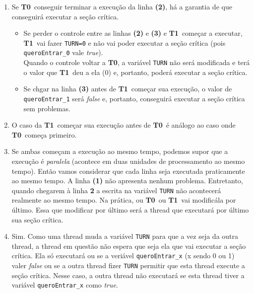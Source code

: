 \documentclass{article}
\newcommand{\Tz}{\textbf{T0}}
\newcommand{\Tu}{\textbf{T1}}
\begin{document}
\begin{enumerate}[label=\textbf{\alph*)}]
	\item Se \Tz\ conseguir terminar a execução da linha \textbf{(2)}, há a garantia de que conseguirá
		executar a seção crítica.
		\begin{itemize}
			\item Se perder o controle entre as linhas \textbf{(2)} e \textbf{(3)} e \Tu\ começar a
				executar, \Tu\ vai fazer \texttt{TURN=0} e não vai poder executar a seção crítica (pois
				\texttt{queroEntrar\_0} vale \emph{true}).\\
				Quando o controle voltar a \Tz, a variável \texttt{TURN} não será modificada e terá o valor
				que \Tu\ deu a ela (0) e, portanto, poderá executar a seção crítica.
			\item Se chgar na linha \textbf{(3)} antes de \Tu\ começar sua execução, o valor de
				\texttt{queroEntrar\_1} será \emph{false} e, portanto, conseguirá executar a seção crítica
				sem problemas.
		\end{itemize}
	\item
		O caso da \Tu\ começar sua execução antes de \Tz\ é análogo ao caso onde \Tz\ começa primeiro.
	\item
		Se ambas começam a execução ao mesmo tempo, podemos supor que a execução é \emph{paralela} (acontece
		em duas unidades de processamento ao mesmo tempo). Então vamos considerar que cada linha seja executada
		praticamente ao mesmo tempo. A linha \textbf{(1)} não apresenta nenhum problema. Entretanto, quando
		chegarem à linha \textbf{2} a escrita na variável \texttt{TURN} não acontecerá realmente ao mesmo tempo.
		Na prática, ou \Tz\ ou \Tu\ vai modificála por último. Essa que modificar por último será a thread que
		executará por último sua seção crítica.
	\item
		Sim. Como uma thread muda a variável \texttt{TURN} para que a vez seja da outra thread, a thread em
		questão não espera que seja ela que vai executar a seção crítica. Ela só executará ou se a veriável
		\texttt{queroEntrar\_x} (x sendo 0 ou 1) valer \emph{false} ou se a outra thread fizer
		\texttt{TURN} permitir que esta thread execute a seção crítica. Nesse caso, a outra thread não executará
		se esta thread tiver a variável \texttt{queroEntrar\_x} como \emph{true}.
\end{enumerate}
\end{document}
